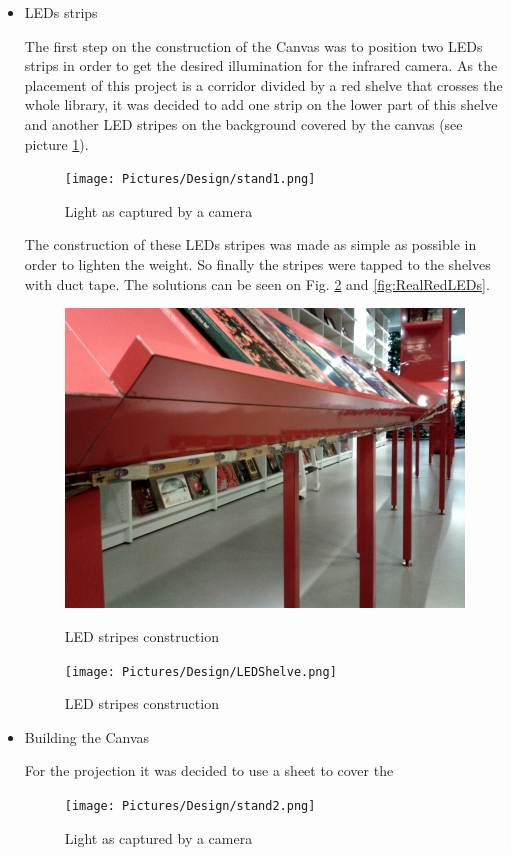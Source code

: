 \begin{itemize}
\item LEDs strips

The first step on the construction of the Canvas was to position two LEDs strips in order to get the desired illumination for the infrared camera. As the placement of this project is a corridor divided by a red shelve that crosses the whole library, it was decided to add one strip on the lower part of this shelve and another LED stripes on the background covered by the canvas (see picture \ref{fig:LEDsPosition}).

\begin{figure}[htbp] 
\centering 
\texttt{[image: Pictures/Design/stand1.png]} 
\caption{Light as captured by a camera} 
\label{fig:LEDsPosition} 
\end{figure}

The construction of these LEDs stripes was made as simple as possible in order to lighten the weight. So finally the stripes were tapped to the shelves with duct tape. The solutions can be seen on Fig. \ref{fig:RealLEDs} and \ref{fig:RealRedLEDs}.

\begin{figure}[htbp] \centering
\begin{minipage}[b]{0.45\textwidth} \centering
\includegraphics[width=1.00\textwidth]{Pictures/Design/LEDRedShelve.png}
\caption{LED stripes construction}
\label{fig:RealRedLEDs}
\end{minipage} \hfill
\begin{minipage}[b]{0.45\textwidth} \centering
\texttt{[image: Pictures/Design/LEDShelve.png]} 
\caption{LED stripes construction}
\label{fig:RealLEDs}
\end{minipage} \hfill
\end{figure}

\item Building the Canvas

For the projection it was decided to use a sheet to cover the 
\begin{figure}[htbp] 
\centering 
\texttt{[image: Pictures/Design/stand2.png]} 
\caption{Light as captured by a camera} 
\label{fig:CanvasPosition} 
\end{figure}

\end{itemize}
